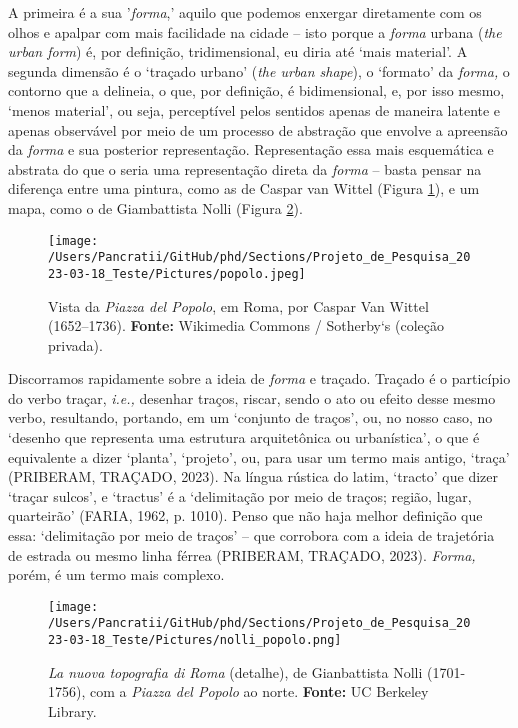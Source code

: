 \documentclass[]{report}
\begin{document}
	A primeira é a sua '\textit{forma},' aquilo que podemos enxergar diretamente com os olhos e apalpar com mais facilidade na cidade – isto porque a \textit{forma} urbana (\textit{the urban form}) é, por definição, tridimensional, eu diria até `mais material'. A segunda dimensão é o `traçado urbano' (\textit{the urban shape}), o `formato' da \textit{forma,} o contorno que a delineia, o que, por definição, é bidimensional, e, por isso mesmo, `menos material', ou seja, perceptível pelos sentidos apenas de maneira latente e apenas observável por meio de um processo de abstração que envolve a apreensão da \textit{forma} e sua posterior representação. Representação essa mais esquemática e abstrata do que o seria uma representação direta da \textit{forma} – basta pensar na diferença entre uma pintura, como as de Caspar van Wittel (Figura \ref{fig:popolo}), e um mapa, como o de Giambattista Nolli (Figura \ref{fig:nolli_popolo}).

\begin{figure}[h]
	\centering
	\texttt{[image: /Users/Pancratii/GitHub/phd/Sections/Projeto\_de\_Pesquisa\_2023-03-18\_Teste/Pictures/popolo.jpeg]} 
	\captionsetup{labelfont=bf}
	\caption{Vista da \textit{Piazza del Popolo}, em Roma, por Caspar Van Wittel (1652–1736). \textbf{Fonte:} Wikimedia Commons / Sotherby`s (coleção privada).}
	\label{fig:popolo}
\end{figure}   

Discorramos rapidamente sobre a ideia de \textit{forma} e traçado. Traçado é o particípio do verbo traçar, \textit{i.e.,} desenhar traços, riscar, sendo o ato ou efeito desse mesmo verbo, resultando, portando, em um `conjunto de traços', ou, no nosso caso, no `desenho que representa uma estrutura arquitetônica ou urbanística', o que é equivalente a dizer `planta', `projeto', ou, para usar um termo mais antigo, `traça' (PRIBERAM, TRAÇADO, 2023). Na língua rústica do latim, `tracto' que dizer `traçar sulcos', e `tractus' é a `delimitação por meio de traços; região, lugar, quarteirão' (FARIA, 1962, p. 1010). Penso que não haja melhor definição que essa: `delimitação por meio de traços' – que corrobora com a ideia de trajetória de estrada ou mesmo linha férrea (PRIBERAM, TRAÇADO, 2023). \textit{Forma,} porém, é um termo mais complexo.

 \begin{figure}
	\centering
	\texttt{[image: /Users/Pancratii/GitHub/phd/Sections/Projeto\_de\_Pesquisa\_2023-03-18\_Teste/Pictures/nolli\_popolo.png]}
	\captionsetup{labelfont=bf}
	\caption{\textit{La nuova topografia di Roma} (detalhe), de Gianbattista Nolli (1701-1756), com a \textit{Piazza del Popolo} ao norte. \textbf{Fonte:} UC Berkeley Library.}
	\label{fig:nolli_popolo}
\end{figure} 
\end{document}

